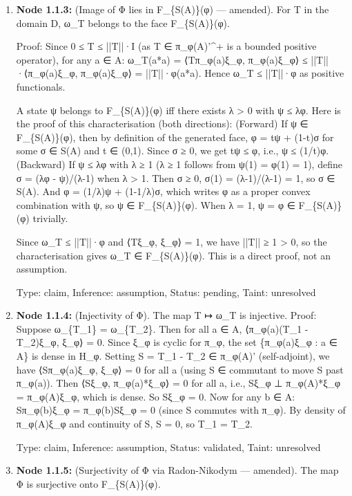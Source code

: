 \documentclass{article}
\begin{document}
\begin{enumerate}
\begin{enumerate}
  Type: claim, Inference: assumption, Status: pending, Taint: unresolved

\item \textbf{Node 1.1.3:} (Image of Φ lies in F\_\{S(A)\}(φ) — amended). For T in the domain D, ω\_T belongs to the face F\_\{S(A)\}(φ).

Proof: Since 0 ≤ T ≤ ||T||·I (as T ∈ π\_φ(A)'\textasciicircum{}+ is a bounded positive operator), for any a ∈ A: ω\_T(a*a) = ⟨Tπ\_φ(a)ξ\_φ, π\_φ(a)ξ\_φ⟩ ≤ ||T||·⟨π\_φ(a)ξ\_φ, π\_φ(a)ξ\_φ⟩ = ||T||·φ(a*a). Hence ω\_T ≤ ||T||·φ as positive functionals.

A state ψ belongs to F\_\{S(A)\}(φ) iff there exists λ > 0 with ψ ≤ λφ. Here is the proof of this characterisation (both directions): (Forward) If ψ ∈ F\_\{S(A)\}(φ), then by definition of the generated face, φ = tψ + (1-t)σ for some σ ∈ S(A) and t ∈ (0,1). Since σ ≥ 0, we get tψ ≤ φ, i.e., ψ ≤ (1/t)φ. (Backward) If ψ ≤ λφ with λ ≥ 1 (λ ≥ 1 follows from ψ(1) = φ(1) = 1), define σ = (λφ - ψ)/(λ-1) when λ > 1. Then σ ≥ 0, σ(1) = (λ-1)/(λ-1) = 1, so σ ∈ S(A). And φ = (1/λ)ψ + (1-1/λ)σ, which writes φ as a proper convex combination with ψ, so ψ ∈ F\_\{S(A)\}(φ). When λ = 1, ψ = φ ∈ F\_\{S(A)\}(φ) trivially.

Since ω\_T ≤ ||T||·φ and ⟨Tξ\_φ, ξ\_φ⟩ = 1, we have ||T|| ≥ 1 > 0, so the characterisation gives ω\_T ∈ F\_\{S(A)\}(φ). This is a direct proof, not an assumption.

  Type: claim, Inference: assumption, Status: pending, Taint: unresolved

\item \textbf{Node 1.1.4:} (Injectivity of Φ). The map T ↦ ω\_T is injective. Proof: Suppose ω\_\{T\_1\} = ω\_\{T\_2\}. Then for all a ∈ A, ⟨π\_φ(a)(T\_1 - T\_2)ξ\_φ, ξ\_φ⟩ = 0. Since ξ\_φ is cyclic for π\_φ, the set \{π\_φ(a)ξ\_φ : a ∈ A\} is dense in H\_φ. Setting S = T\_1 - T\_2 ∈ π\_φ(A)' (self-adjoint), we have ⟨Sπ\_φ(a)ξ\_φ, ξ\_φ⟩ = 0 for all a (using S ∈ commutant to move S past π\_φ(a)). Then ⟨Sξ\_φ, π\_φ(a)*ξ\_φ⟩ = 0 for all a, i.e., Sξ\_φ ⊥ π\_φ(A)*ξ\_φ = π\_φ(A)ξ\_φ, which is dense. So Sξ\_φ = 0. Now for any b ∈ A: Sπ\_φ(b)ξ\_φ = π\_φ(b)Sξ\_φ = 0 (since S commutes with π\_φ). By density of π\_φ(A)ξ\_φ and continuity of S, S = 0, so T\_1 = T\_2.

  Type: claim, Inference: assumption, Status: validated, Taint: unresolved

\item \textbf{Node 1.1.5:} (Surjectivity of Φ via Radon-Nikodym — amended). The map Φ is surjective onto F\_\{S(A)\}(φ).


\end{enumerate}
\end{enumerate}
\end{document}
